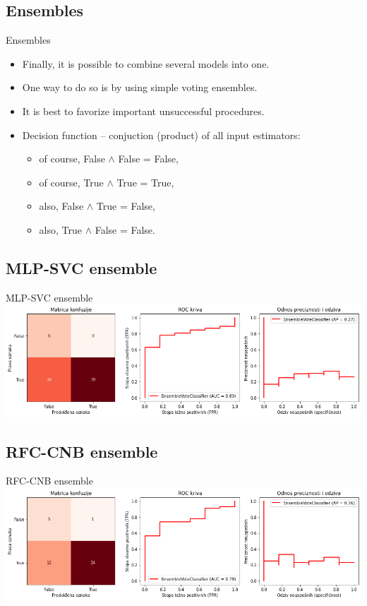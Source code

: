 \documentclass[hyperref={bookmarks=false}]{beamer}
\begin{document}
\subsection{Ensembles}
\begin{frame}{Ensembles}
\begin{itemize}
    \item Finally, it is possible to combine several models into one.
    \item One way to do so is by using simple voting ensembles.
    \item It is best to favorize important unsuccessful procedures.
    \item Decision function -- conjuction (product) of all input estimators:
    \begin{itemize}
        \item of course, False $\wedge$ False = False,
        \item of course, True $\wedge$ True = True,
        \item also, False $\wedge$ True = False,
        \item also, True $\wedge$ False = False.
    \end{itemize}
\end{itemize}
\end{frame}

\subsection{MLP-SVC ensemble}
\begin{frame}{MLP-SVC ensemble}
\includegraphics[width=\textwidth]{mlpsvc.png}
\end{frame}

\subsection{RFC-CNB ensemble}
\begin{frame}{RFC-CNB ensemble}
\includegraphics[width=\textwidth]{forcnb.png}
\end{frame}
\end{document}
